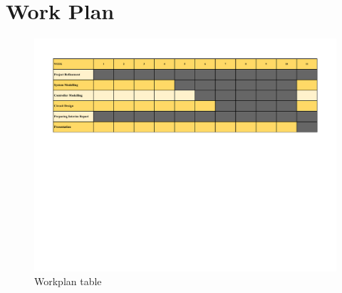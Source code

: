 \section{Work Plan}
\begin{figure}[!h]
\includegraphics[width=1.059\linewidth]{Figures/workplan2}
\caption{Workplan table}
\end{figure}

